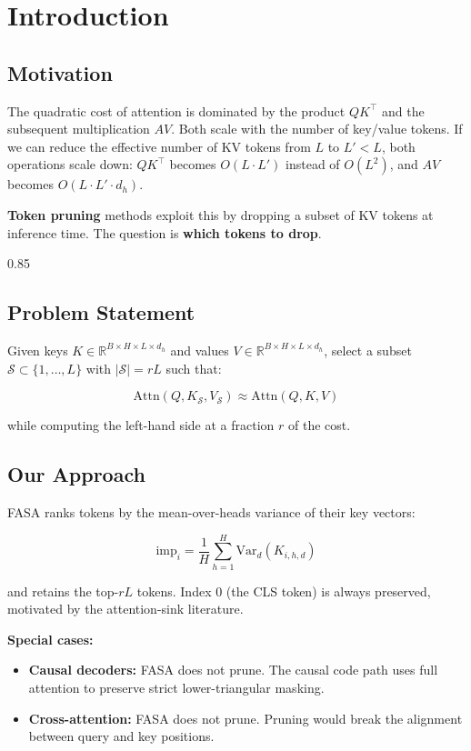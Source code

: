 
\section{Introduction}

\subsection{Motivation}

The quadratic cost of attention is dominated by the product $QK^\top$ and 
the subsequent multiplication $AV$. Both scale with the number of key/value 
tokens. If we can reduce the effective number of KV tokens from $L$ to 
$L' < L$, both operations scale down: $QK^\top$ becomes $O(L \cdot L')$ 
instead of $O(L^2)$, and $AV$ becomes $O(L \cdot L' \cdot d_h)$.

\textbf{Token pruning} methods exploit this by dropping a subset of KV tokens 
at inference time. The question is \textbf{which tokens to drop}.

0.85


\subsection{Problem Statement}

Given keys $K \in \mathbb{R}^{B \times H \times L \times d_h}$ and values 
$V \in \mathbb{R}^{B \times H \times L \times d_h}$, select a subset 
$\mathcal{S} \subset \{1, \ldots, L\}$ with $|\mathcal{S}| = r L$ such that:

\[
\text{Attn}(Q, K_{\mathcal{S}}, V_{\mathcal{S}}) \approx \text{Attn}(Q, K, V)
\tag{1.1}
\]

while computing the left-hand side at a fraction $r$ of the cost.

\subsection{Our Approach}

FASA ranks tokens by the mean-over-heads variance of their key vectors:

\[
\text{imp}_i = \frac{1}{H} \sum_{h=1}^{H} \text{Var}_d(K_{i,h,d})
\tag{1.2}
\]

and retains the top-$rL$ tokens. Index 0 (the CLS token) is always 
preserved, motivated by the attention-sink literature.

\textbf{Special cases:}
\begin{itemize}
\item \textbf{Causal decoders:} FASA does not prune. The causal code path uses full
  attention to preserve strict lower-triangular masking.
\item \textbf{Cross-attention:} FASA does not prune. Pruning would break the
  alignment between query and key positions.

\end{itemize}
